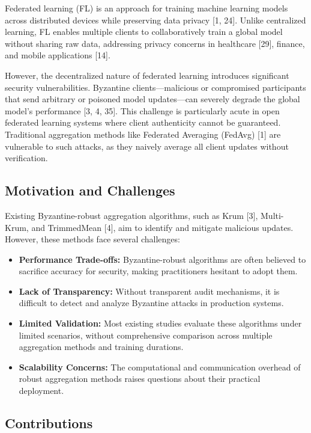 \documentclass[12pt,a4paper,onecolumn]{article}
\begin{document}
Federated learning (FL) is an approach for training machine learning models across distributed devices while preserving data privacy [1, 24]. Unlike centralized learning, FL enables multiple clients to collaboratively train a global model without sharing raw data, addressing privacy concerns in healthcare [29], finance, and mobile applications [14].

However, the decentralized nature of federated learning introduces significant security vulnerabilities. Byzantine clients---malicious or compromised participants that send arbitrary or poisoned model updates---can severely degrade the global model's performance [3, 4, 35]. This challenge is particularly acute in open federated learning systems where client authenticity cannot be guaranteed. Traditional aggregation methods like Federated Averaging (FedAvg) [1] are vulnerable to such attacks, as they naively average all client updates without verification.

\subsection{Motivation and Challenges}

Existing Byzantine-robust aggregation algorithms, such as Krum [3], Multi-Krum, and TrimmedMean [4], aim to identify and mitigate malicious updates. However, these methods face several challenges:

\begin{itemize}
    \item \textbf{Performance Trade-offs:} Byzantine-robust algorithms are often believed to sacrifice accuracy for security, making practitioners hesitant to adopt them.
    \item \textbf{Lack of Transparency:} Without transparent audit mechanisms, it is difficult to detect and analyze Byzantine attacks in production systems.
    \item \textbf{Limited Validation:} Most existing studies evaluate these algorithms under limited scenarios, without comprehensive comparison across multiple aggregation methods and training durations.
    \item \textbf{Scalability Concerns:} The computational and communication overhead of robust aggregation methods raises questions about their practical deployment.
\end{itemize}

\subsection{Contributions}
\end{document}
